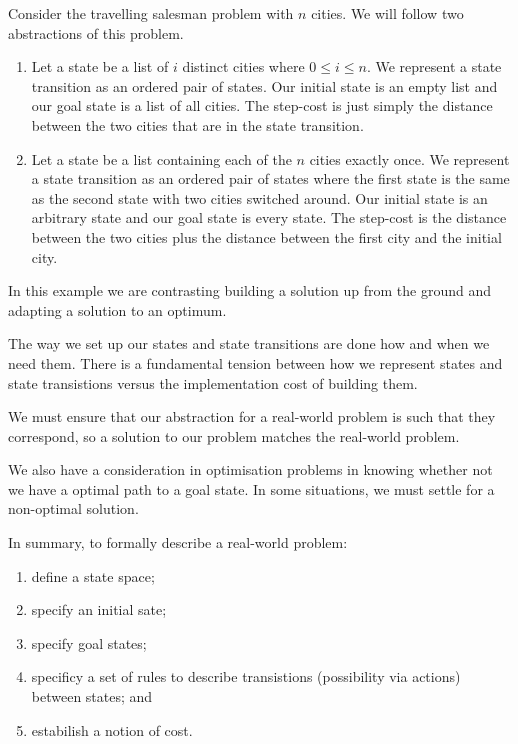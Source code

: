 \begin{example}
    Consider the travelling salesman problem with $n$ cities. We will follow two abstractions of this problem.
    \begin{enumerate}
        \item Let a state be a list of $i$ distinct cities where $0 \leq i \leq n$. We represent a state transition as an ordered pair of states. Our initial state is an empty list and our goal state is a list of all cities. The step-cost is just simply the distance between the two cities that are in the state transition.

        \item Let a state be a list containing each of the $n$ cities exactly once. We represent a state transition as an ordered pair of states where the first state is the same as the second state with two cities switched around.  Our initial state is an arbitrary state and our goal state is every state. The step-cost is the distance between the two cities plus the distance between the first city and the initial city.
    \end{enumerate}
    In this example we are contrasting building a solution up from the ground and adapting a solution to an optimum.
\end{example}

The way we set up our states and state transitions are done how and when we need them. There is a fundamental tension between how we represent states and state transistions versus the implementation cost of building them.

We must ensure that our abstraction for a real-world problem is such that they correspond, so a solution to our problem matches the real-world problem.

We also have a consideration in optimisation problems in knowing whether not we have a optimal path to a goal state. In some situations, we must settle for a non-optimal solution.

In summary, to formally describe a real-world problem:

\begin{enumerate}
    \item define a state space;
    \item specify an initial sate;
    \item specify goal states;
    \item specificy a set of rules to describe transistions (possibility via actions) between states; and
    \item estabilish a notion of cost.
\end{enumerate}

